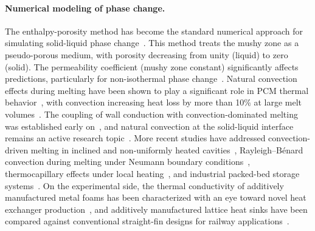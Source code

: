 \paragraph{Numerical modeling of phase change.}
The enthalpy-porosity method has become the standard numerical approach for simulating solid-liquid phase change~\cite{ebrahimi2019sensitivity,vanriet2024limitations}. This method treats the mushy zone as a pseudo-porous medium, with porosity decreasing from unity (liquid) to zero (solid). The permeability coefficient (mushy zone constant) significantly affects predictions, particularly for non-isothermal phase change~\cite{ebrahimi2019sensitivity}. Natural convection effects during melting have been shown to play a significant role in PCM thermal behavior~\cite{cao2021characterization,souayfane2018melting,bondareva2021natural}, with convection increasing heat loss by more than 10\% at large melt volumes~\cite{bondareva2021natural}. The coupling of wall conduction with convection-dominated melting was established early on~\cite{lacroix1994coupling}, and natural convection at the solid-liquid interface remains an active research topic~\cite{gobin2004natural}. More recent studies have addressed convection-driven melting in inclined and non-uniformly heated cavities~\cite{laouer2021study,bondareva2023natural}, Rayleigh--B{\'e}nard convection during melting under Neumann boundary conditions~\cite{parsazadeh2021numerical}, thermocapillary effects under local heating~\cite{kim2013numerical}, and industrial packed-bed storage systems~\cite{schwarzmayr2023packed,rai2023numerical}. On the experimental side, the thermal conductivity of additively manufactured metal foams has been characterized with an eye toward novel heat exchanger production~\cite{kovalevsky2020experimental}, and additively manufactured lattice heat sinks have been compared against conventional straight-fin designs for railway applications~\cite{batikh2024investigating}.
